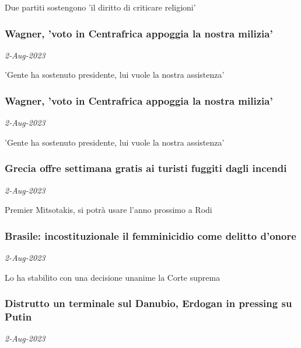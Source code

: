 Due partiti sostengono 'il diritto di criticare religioni'
\subsubsection{Wagner, 'voto in Centrafrica appoggia la nostra milizia' \href{https://www.ansa.it/sito/notizie/mondo/africa/2023/08/02/wagner-voto-in-centrafrica-appoggia-la-nostra-milizia_360200ff-0bd5-478f-b8cc-8a261d6850fa.html}{}}
\textit{2-Aug-2023}

'Gente ha sostenuto presidente, lui vuole la nostra assistenza'
\subsubsection{Wagner, 'voto in Centrafrica appoggia la nostra milizia' \href{https://www.ansa.it/sito/notizie/mondo/europa/2023/08/02/wagner-voto-in-centrafrica-appoggia-la-nostra-milizia_175ffd1e-6138-4fee-98e7-bc9de981aedc.html}{}}
\textit{2-Aug-2023}

'Gente ha sostenuto presidente, lui vuole la nostra assistenza'
\subsubsection{Grecia offre settimana gratis ai turisti fuggiti dagli incendi \href{https://www.ansa.it/sito/notizie/mondo/europa/2023/08/02/grecia-offre-settimana-gratis-ai-turisti-fuggiti-dagli-incendi_0f7351b4-f09d-43fd-86f2-9eaf2074087e.html}{}}
\textit{2-Aug-2023}

Premier Mitsotakis, si potr\`{a} usare l'anno prossimo a Rodi
\subsubsection{Brasile: incostituzionale il femminicidio come delitto d'onore \href{https://www.ansa.it/sito/notizie/mondo/americalatina/2023/08/02/brasile-incostituzionale-il-femminicidio-come-delitto-donore_04da6f1a-70e6-49bd-ada4-3a85ef42641c.html}{}}
\textit{2-Aug-2023}

Lo ha stabilito con una decisione unanime la Corte suprema
\subsubsection{Distrutto un terminale sul Danubio, Erdogan in pressing su Putin \href{https://www.ansa.it/sito/notizie/mondo/europa/2023/08/02/distrutto-un-terminale-sul-danubio-stop-al-grano_4d48e89f-6a56-487b-9451-8c32bc9af6d5.html}{}}
\textit{2-Aug-2023}

